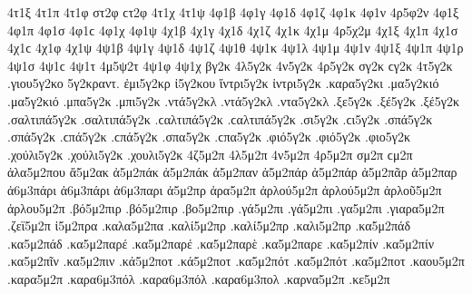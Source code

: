{4τ1ξ 
4τ1π 
4τ1φ 
στ2φ ϲτ2φ   %
4τ1χ 
4τ1ψ 
4φ1β 
4φ1γ 
4φ1δ 
4φ1ζ 
4φ1κ   %
4φ1ν 
4ρ5φ2ν   %
4φ1ξ 
4φ1π 
4φ1σ 4φ1ϲ 
4φ1χ 
4φ1ψ 
4χ1β 
4χ1γ 
4χ1δ 
4χ1ζ 
4χ1κ 
4χ1μ 
4ρ5χ2μ   %
4χ1ξ 
4χ1π 
4χ1σ 4χ1ϲ 
4χ1φ 
4χ1ψ 
4ψ1β 
4ψ1γ 
4ψ1δ 
4ψ1ζ 
4ψ1θ 
4ψ1κ 
4ψ1λ 
4ψ1μ 
4ψ1ν 
4ψ1ξ 
4ψ1π 
4ψ1ρ 
4ψ1σ 4ψ1ϲ 
4ψ1τ 
4μ5ψ2τ   %
4ψ1φ 
4ψ1χ 
βγ2κ 
4λ5γ2κ 
4ν5γ2κ 
4ρ5γ2κ 
σγ2κ ϲγ2κ 
4τ5γ2κ 
.γιου5γ2κο   %
5γ2κραντ.   %
ἐμι5γ2κρ   %
ἰ5γ2κου   %
ἴντρι5γ2κ   %
ἰντρι5γ2κ 
.καρα5γ2κι   %
.μα5γ2κιό .μα5γ2κιό   %
.μπα5γ2κ   %
.μπι5γ2κ   %
.ντά5γ2κλ .ντά5γ2κλ   %
.ντα5γ2κλ   %
.ξε5γ2κ   %
.ξέ5γ2κ .ξέ5γ2κ 
.σαλτιπά5γ2κ .σαλτιπά5γ2κ .ϲαλτιπά5γ2κ .ϲαλτιπά5γ2κ   %
.σι5γ2κ .ϲι5γ2κ   %
.σπά5γ2κ .σπά5γ2κ .ϲπά5γ2κ .ϲπά5γ2κ   %
.σπα5γ2κ .ϲπα5γ2κ 
.φιό5γ2κ .φιό5γ2κ   %
.φιο5γ2κ 
.χούλι5γ2κ .χούλι5γ2κ   %
.χουλι5γ2κ 
4ζ5μ2π 
4λ5μ2π 
4ν5μ2π 
4ρ5μ2π 
σμ2π ϲμ2π 
ἀλα5μ2που   %
ἄ5μ2ακ   %
ἀ5μ2πάκ ἀ5μ2πάκ 
ἀ5μ2παν   %
ἀ5μ2πάρ ἀ5μ2πάρ   %
ἀ5μ2πᾶρ 
ἀ5μ2παρ 
ἀ6μ3πάρι ἀ6μ3πάρι   %
ἀ6μ3παρι 
ἀ5μ2πρ   %
ἀρα5μ2π   %
ἀρλού5μ2π ἀρλού5μ2π   %
ἀρλοῦ5μ2π 
ἀρλου5μ2π 
.βό5μ2πιρ .βό5μ2πιρ   %
.βο5μ2πιρ   %
.γά5μ2πι .γά5μ2πι   %
.γα5μ2πι 
.γιαρα5μ2π   %
.ζεϊ5μ2π   %
ἰ5μ2πρα   %
.καλα5μ2πα   %
.καλί5μ2πρ .καλί5μ2πρ   %
.καλι5μ2πρ 
.κα5μ2πάδ .κα5μ2πάδ   %
.κα5μ2παρέ .κα5μ2παρέ   %
.κα5μ2παρὲ 
.κα5μ2παρε 
.κα5μ2πίν .κα5μ2πίν   %
.κα5μ2πῖν 
.κα5μ2πιν 
.κά5μ2ποτ .κά5μ2ποτ   %
.κα5μ2πότ .κα5μ2πότ 
.κα5μ2ποτ 
.καου5μ2π   %
.καρα5μ2π   %
.καρα6μ3πόλ .καρα6μ3πόλ   %
.καρα6μ3πολ 
.καρνα5μ2π   %
.κε5μ2π   %
}
